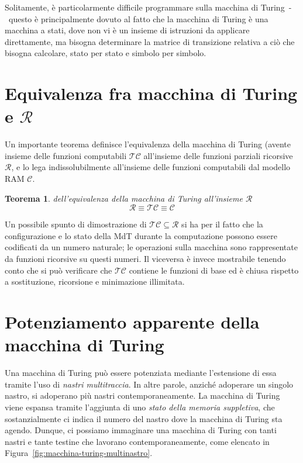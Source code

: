 \documentclass[10pt]{book}
\newtheorem{thm}{Teorema}
\begin{document}
Solitamente, è particolarmente difficile programmare sulla macchina di
Turing~\--~questo è principalmente dovuto al fatto che la macchina di Turing è
una macchina a stati, dove non vi è un insieme di istruzioni da applicare
direttamente, ma bisogna determinare la matrice di transizione relativa a ciò
che bisogna calcolare, stato per stato e simbolo per simbolo.


\section{Equivalenza fra macchina di Turing e $\mathcal R$}

Un importante teorema definisce l'equivalenza della macchina di Turing (avente
insieme delle funzioni computabili $\mathcal{TC}$ all'insieme delle funzioni
parziali ricorsive $\mathcal R$, e lo lega indissolubilmente all'insieme delle
funzioni computabili dal modello RAM $\mathcal C$.

\begin{thm}{dell'equivalenza della macchina di Turing all'insieme $\mathcal R$}
    $$\mathcal R \equiv \mathcal {TC} \equiv \mathcal C$$
\end{thm}

Un possibile spunto di dimostrazione di $\mathcal {TC} \subseteq \mathcal R$ si
ha per il fatto che la configurazione e lo stato della MdT durante la
computazione possono essere codificati da un numero naturale; le operazioni
sulla macchina sono rappresentate da funzioni ricorsive su questi numeri. Il
viceversa è invece mostrabile tenendo conto che si può verificare che
$\mathcal{TC}$ contiene le funzioni di base ed è chiusa rispetto a sostituzione,
ricorsione e minimazione illimitata.

\section{Potenziamento apparente della macchina di Turing}

Una macchina di Turing può essere potenziata mediante l'estensione di essa
tramite l'uso di \emph{nastri multitraccia}. In altre parole, anziché adoperare
un singolo nastro, si adoperano più nastri contemporaneamente. La macchina di
Turing viene espansa tramite l'aggiunta di uno \emph{stato della memoria
suppletiva}, che sostanzialmente ci indica il numero del nastro dove la
macchina di Turing sta agendo. Dunque, ci possiamo immaginare una macchina di
Turing con tanti nastri e tante testine che lavorano contemporaneamente, come
elencato in Figura~\ref{fig:macchina-turing-multinastro}.
\end{document}
